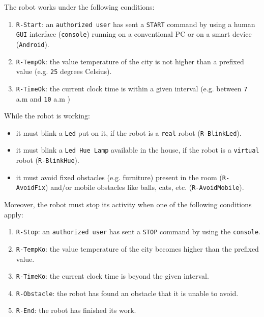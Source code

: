\documentclass{../llncs}
\newcommand{\code}[1]{{\color{blue}\small{\texttt{#1}}}}
\newcommand{\fname}[1]{{\small{\color{magenta}\texttt{#1}}}}
\begin{document}
The robot works under the following conditions:
\begin{enumerate}
\item \code{R-Start}: an \code{authorized user} has sent a \texttt{START} command by using a human \texttt{GUI} interface (\code{console}) running
on a conventional PC or on a smart device (\texttt{Android}).
\item \code{R-TempOk}: the value temperature of the city is not higher than a prefixed value (e.g. \texttt{25} degrees Celsius).
\item \code{R-TimeOk}: the current clock time is within a given interval (e.g. between \texttt{7} a.m and \texttt{10} a.m )
\end{enumerate}

While the robot is working:
\begin{itemize}[label={--}]
\item it must blink a \texttt{Led} put on it, if the robot is a \fname{real} robot (\code{R-BlinkLed}).
\item it must blink a \texttt{Led Hue Lamp} available in the house, if the robot is a \fname{virtual} robot (\code{R-BlinkHue}).
\item it must avoid fixed obstacles (e.g. furniture) present in the room (\code{R-AvoidFix}) and/or mobile obstacles like
balls, cats, etc. (\code{R-AvoidMobile}).
\end{itemize}

Moreover, the robot must stop its activity when one of the following conditions apply:
\begin{enumerate}
\item \code{R-Stop}: an \code{authorized user} has sent a \texttt{STOP} command by using the \code{console}.
\item \code{R-TempKo}: the value temperature of the city becomes higher than the prefixed value.
\item \code{R-TimeKo}: the current clock time is beyond the given interval.
\item \code{R-Obstacle}: the robot has found an obstacle that it is unable to avoid.
\item \code{R-End}: the robot has finished its work.
\end{enumerate}
\end{document}
